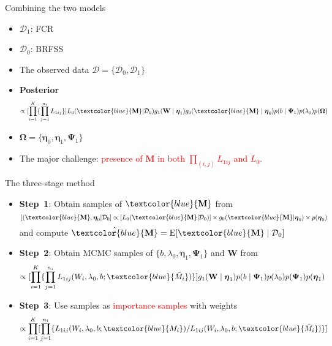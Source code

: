 \documentclass{beamer}
\begin{document}
\begin{frame}{Combining the two models}
\begin{itemize} 
  \vfill \item \( \mathcal{D}_1\): FCR
 \vfill \item $\mathcal{D}_0$: BRFSS
  \vfill  \item The observed data  \(\mathcal{D}=\{\mathcal{D}_0,\mathcal{D}_1\}\)
\vfill \item \textbf{Posterior}  
\[\propto 
[\prod_{i=1}^K\{\prod_{j=1}^{n_i} L_{1ij}\}]  L_0(\textcolor{blue}{\mathbf{M}}|\mathcal{D}_0) g_1(\mathbf{W} \mid \boldsymbol{\eta}_1) g_0(\textcolor{blue}{\mathbf{M}} \mid \boldsymbol{\eta}_0)  p(b \mid \boldsymbol{\Psi}_1)  p(\lambda_0)  p(\boldsymbol{\Omega}) \]
\vfill \item \(\boldsymbol{\Omega}=\{\boldsymbol{\eta}_0,\boldsymbol{\eta}_1,\boldsymbol{\Psi}_1\}\)

   \vfill \item The major challenge: \textcolor{red}{presence of $\mathbf{M}$ in both $\prod_{(i,j)} L_{1ij}$ and $L_0$.} 
\end{itemize}  
\end{frame}
\begin{frame}{The three-stage method}
\begin{itemize}
    \vfill \item \textbf{Step~1}: Obtain samples of \(\textcolor{blue}{\mathbf{M}}\) from 
    \[ \left[(\textcolor{blue}{\mathbf{M}},\boldsymbol{\eta}_0\vert \mathcal{D}_0]\propto [L_0(\textcolor{blue}{\mathbf{M}}|\mathcal{D}_0)\right]\times g_0(\textcolor{blue}{\mathbf{M}}|\boldsymbol{\eta}_0)\times p(\boldsymbol{\eta}_0)\] 
    and compute \(\hat{\textcolor{blue}{\mathbf{M}}}=\operatorname{E}[\textcolor{blue}{\mathbf{M}}\mid \mathcal{D}_0]\)
    
    
    \vfill \item \textbf{Step~2}: Obtain MCMC samples of $\{b,\lambda_0,\boldsymbol{\eta}_1,\boldsymbol{\Psi}_1\}$ and $\mathbf{W}$ from 
\[\propto 
[\prod_{i=1}^K\{\prod_{j=1}^{n_i} L_{1ij}(W_i,\lambda_0,b;\textcolor{blue}{\hat{M}_i})\}] g_1(\mathbf{W} \mid \boldsymbol{\eta}_1) p(b \mid \boldsymbol{\Psi}_1) p(\lambda_0)p(\boldsymbol{\Psi}_1) p(\boldsymbol{\eta}_1)\ 
\]

\vfill \item \textbf{Step~3}: Use samples as \textcolor{red}{importance samples} with weights 
\[\propto \prod_{i=1}^K[\prod_{j=1}^{n_i}\{ L_{1ij}(W_i,\lambda_0,b;\textcolor{blue}{M_i})/ L_{1ij}(W_i,\lambda_0,b;\textcolor{blue}{\hat{M}_i})\}]\]
\end{itemize}
\end{frame}
\end{document}
